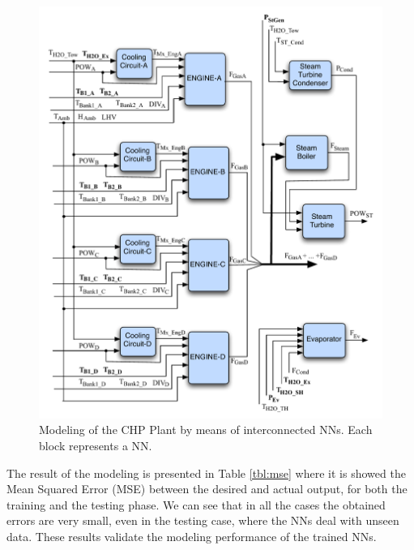 \begin{figure}
\includegraphics[width=1\textwidth]{NNs.pdf}
\caption{Modeling of the CHP Plant by means of interconnected NNs. Each block represents a NN.}
\label{fignns}
\end{figure}


The result of the modeling is presented in Table \ref{tbl:mse} where it is showed the Mean Squared Error (MSE) between the desired and actual output, for both the training and the testing phase. We can see that in all the cases the obtained  errors are very small, even in the testing case, where the NNs deal with unseen data. These results validate the modeling performance of the trained NNs. 

